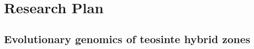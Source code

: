 %
%
%


\section*{Research Plan}

\subsection{Evolutionary genomics of teosinte hybrid zones}
\label{ss:hybrids}
